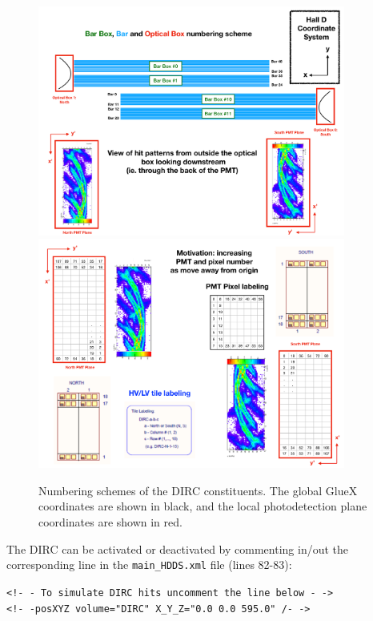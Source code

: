 \begin{figure}[!h]
\centering
\includegraphics[width=0.9\textwidth]{pics/DIRC_Geometry11.pdf}\\
\includegraphics[width=0.9\textwidth]{pics/DIRC_Geometry22.pdf}
\caption{\label{pic:dircNumb}
Numbering schemes of the DIRC constituents. The global GlueX coordinates are shown in black, and the local photodetection plane coordinates are shown in red.
}
\end{figure}

The DIRC can be activated or deactivated by commenting in/out the corresponding line in the \texttt{main{\_}HDDS.xml} file (lines 82-83): 

\vspace{0.5cm}
\begin{center}
 \texttt{<!- - To simulate DIRC hits uncomment the line below - -> \\
    <!- -posXYZ volume="DIRC" X{\_}Y{\_}Z="0.0 0.0 595.0" /- ->} 
\end{center}
\label{eq:line}
\vspace{0.5cm}

